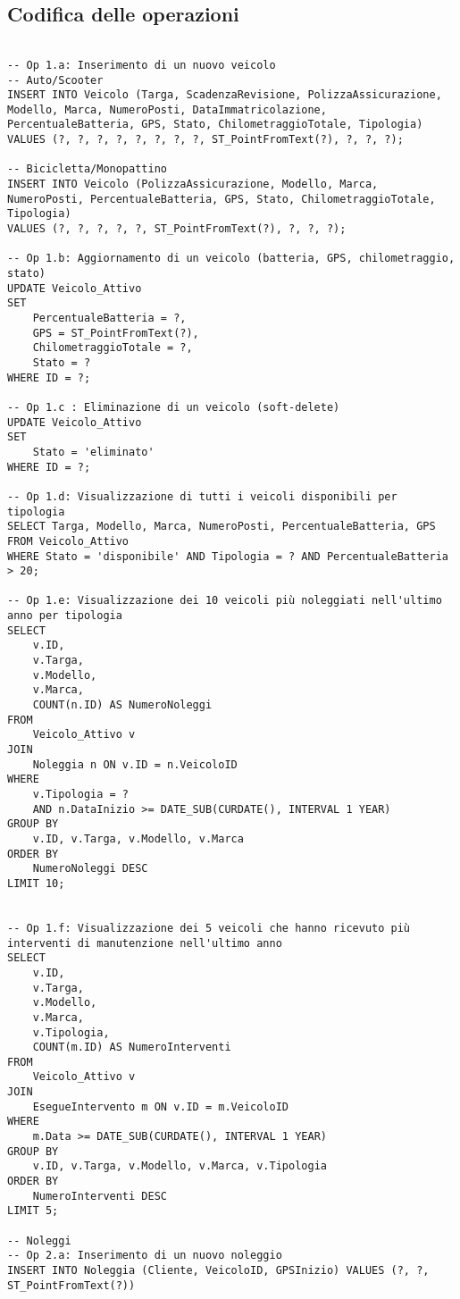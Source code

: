 \documentclass{article}
\begin{document}
\subsection{Codifica delle operazioni}

\begin{lstlisting}

-- Op 1.a: Inserimento di un nuovo veicolo
-- Auto/Scooter
INSERT INTO Veicolo (Targa, ScadenzaRevisione, PolizzaAssicurazione, Modello, Marca, NumeroPosti, DataImmatricolazione, PercentualeBatteria, GPS, Stato, ChilometraggioTotale, Tipologia)
VALUES (?, ?, ?, ?, ?, ?, ?, ?, ST_PointFromText(?), ?, ?, ?);

-- Bicicletta/Monopattino
INSERT INTO Veicolo (PolizzaAssicurazione, Modello, Marca, NumeroPosti, PercentualeBatteria, GPS, Stato, ChilometraggioTotale, Tipologia)
VALUES (?, ?, ?, ?, ?, ST_PointFromText(?), ?, ?, ?);

-- Op 1.b: Aggiornamento di un veicolo (batteria, GPS, chilometraggio, stato)
UPDATE Veicolo_Attivo
SET 
	PercentualeBatteria = ?,
	GPS = ST_PointFromText(?),
	ChilometraggioTotale = ?,
	Stato = ?
WHERE ID = ?;

-- Op 1.c : Eliminazione di un veicolo (soft-delete)
UPDATE Veicolo_Attivo
SET 
	Stato = 'eliminato'
WHERE ID = ?;

-- Op 1.d: Visualizzazione di tutti i veicoli disponibili per tipologia
SELECT Targa, Modello, Marca, NumeroPosti, PercentualeBatteria, GPS
FROM Veicolo_Attivo
WHERE Stato = 'disponibile' AND Tipologia = ? AND PercentualeBatteria > 20;

-- Op 1.e: Visualizzazione dei 10 veicoli più noleggiati nell'ultimo anno per tipologia
SELECT 
    v.ID,
    v.Targa,
    v.Modello,
    v.Marca,
    COUNT(n.ID) AS NumeroNoleggi
FROM 
    Veicolo_Attivo v
JOIN 
    Noleggia n ON v.ID = n.VeicoloID
WHERE 
    v.Tipologia = ?
    AND n.DataInizio >= DATE_SUB(CURDATE(), INTERVAL 1 YEAR)
GROUP BY 
    v.ID, v.Targa, v.Modello, v.Marca
ORDER BY 
    NumeroNoleggi DESC
LIMIT 10;


-- Op 1.f: Visualizzazione dei 5 veicoli che hanno ricevuto più interventi di manutenzione nell'ultimo anno
SELECT 
	v.ID,
	v.Targa,
	v.Modello,
	v.Marca,
    v.Tipologia,
	COUNT(m.ID) AS NumeroInterventi
FROM
	Veicolo_Attivo v
JOIN
	EsegueIntervento m ON v.ID = m.VeicoloID
WHERE
	m.Data >= DATE_SUB(CURDATE(), INTERVAL 1 YEAR)
GROUP BY
	v.ID, v.Targa, v.Modello, v.Marca, v.Tipologia
ORDER BY
	NumeroInterventi DESC
LIMIT 5;

-- Noleggi
-- Op 2.a: Inserimento di un nuovo noleggio
INSERT INTO Noleggia (Cliente, VeicoloID, GPSInizio) VALUES (?, ?, ST_PointFromText(?))


\end{lstlisting}
\end{document}
